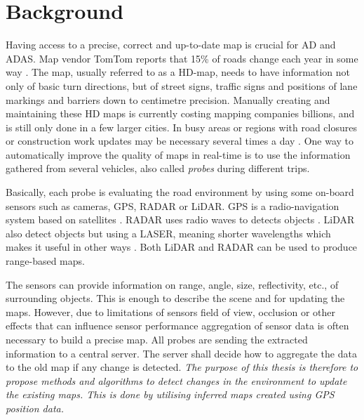 \section{Background}


Having access to a precise, correct and up-to-date map is crucial for \ac{AD} and \ac{ADAS}. Map vendor TomTom reports that 15\% of roads change each year in some way \citep{tomtom}. The map, usually referred to as a \ac{HD}-map, needs to have information not only of basic turn directions, but of street signs, traffic signs and positions of lane markings and barriers down to centimetre precision. Manually creating and maintaining these \ac{HD} maps is currently costing mapping companies billions, and is still only done in a few larger cities. In busy areas or regions with road closures or construction work updates may be necessary several times a day \citep{mapwar}. One way to automatically improve the quality of maps in real-time is to use the information gathered from several vehicles, also called \textit{probes} during different trips. 


Basically, each probe is evaluating the road environment by using some on-board sensors such as cameras, \ac{GPS}, \ac{RADAR} or \ac{LiDAR}. \ac{GPS} is a radio-navigation system based on satellites \citep{gps}. \ac{RADAR} uses radio waves to detects objects \citep{radar}. \ac{LiDAR} also detect objects but using a \ac{LASER}, meaning shorter wavelengths which makes it useful in other ways \citep{lidar}. Both \ac{LiDAR} and \ac{RADAR} can be used to produce range-based maps.

The sensors can provide information on range, angle, size, reflectivity, etc., of surrounding objects. This is enough to describe the scene and for updating the maps. However, due to limitations of sensors field of view, occlusion or other effects that can influence sensor performance aggregation of sensor data is often necessary to build a precise map. All probes are sending the extracted information to a central server. The server shall decide how to aggregate the data to the old map if any change is detected. \textit{The purpose of this thesis is therefore to propose methods and algorithms to detect changes in the environment to update the existing maps. This is done by utilising inferred maps created using \ac{GPS} position data.}


